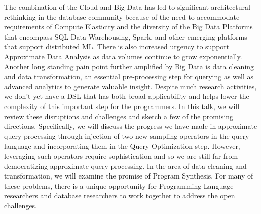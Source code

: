 \documentclass[a4paper,UKenglish]{dagrep-v2018}
\begin{document}
The combination of the Cloud and Big Data has led to significant architectural rethinking in the database community because of the need to accommodate requirements of Compute Elasticity and the diversity of the Big Data Platforms that encompass SQL Data Warehousing, Spark, and other emerging platforms that support distributed ML. There is also increased urgency to support Approximate Data Analysis as data volumes continue to grow exponentially. Another long standing pain point further amplified by Big Data is data cleaning and data transformation, an essential pre-processing step for querying as well as advanced analytics to generate valuable insight. Despite much research activities, we don’t yet have a DSL that has both broad applicability and helps lower the complexity of this important step for the programmers.  In this talk, we will review these disruptions and challenges and sketch a few of the promising directions. Specifically, we will discuss the progress we have made in approximate query processing through injection of two new sampling operators in the query language and incorporating them in the Query Optimization step.  However, leveraging such operators require sophistication and so we are still far from democratizing approximate query processing. In the area of data cleaning and transformation, we will examine the promise of Program Synthesis. For many of these problems, there is a unique opportunity for Programming Language researchers and database researchers to work together to address the open challenges.


\license
\end{document}
